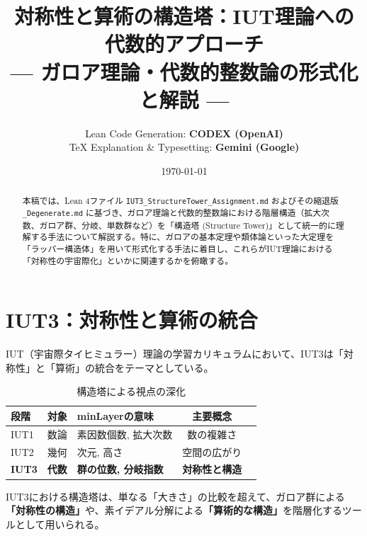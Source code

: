 \documentclass[a4paper,11pt]{ltjsarticle}
\title{\textbf{対称性と算術の構造塔：IUT理論への代数的アプローチ} \\ \large --- ガロア理論・代数的整数論の形式化と解説 ---}
\author{
    Lean Code Generation: \textbf{CODEX (OpenAI)} \\
    TeX Explanation \& Typesetting: \textbf{Gemini (Google)}
}
\date{\today}
\theoremstyle{definition}
\begin{document}
\maketitle

\begin{abstract}
本稿では、Lean 4ファイル \texttt{IUT3\_StructureTower\_Assignment.md} およびその縮退版 \texttt{\_Degenerate.md} に基づき、ガロア理論と代数的整数論における階層構造（拡大次数、ガロア群、分岐、単数群など）を「構造塔 (Structure Tower)」として統一的に理解する手法について解説する。特に、ガロアの基本定理や類体論といった大定理を「ラッパー構造体」を用いて形式化する手法に着目し、これらがIUT理論における「対称性の宇宙際化」といかに関連するかを俯瞰する。
\end{abstract}

\tableofcontents
\newpage

\section{IUT3：対称性と算術の統合}

IUT（宇宙際タイヒミュラー）理論の学習カリキュラムにおいて、IUT3は「対称性」と「算術」の統合をテーマとしている。

\begin{table}[h]
\centering
\caption{構造塔による視点の深化}
\begin{tabular}{lclcl}
\toprule
\textbf{段階} & \textbf{対象} & \textbf{minLayerの意味} & \textbf{主要概念} \\ \midrule
IUT1 & 数論 & 素因数個数, 拡大次数 & 数の複雑さ \\
IUT2 & 幾何 & 次元, 高さ & 空間の広がり \\
\textbf{IUT3} & \textbf{代数} & \textbf{群の位数, 分岐指数} & \textbf{対称性と構造} \\
\bottomrule
\end{tabular}
\end{table}

IUT3における構造塔は、単なる「大きさ」の比較を超えて、ガロア群による\textbf{「対称性の構造」}や、素イデアル分解による\textbf{「算術的な構造」}を階層化するツールとして用いられる。

\end{document}
